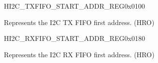     \begin{register}{H}{I2C\_TXFIFO\_START\_ADDR\_REG}{0x0100}\label{regdesc:I2CTXFIFOSTARTADDRREG}
    \regnewline%
    \begin{regdesc}\begin{reglist}
    \label{fielddesc:I2CTXFIFOSTARTADDR}\item [I2C\_TXFIFO\_START\_ADDR] Represents the I2C TX FIFO first address. (HRO)
    \end{reglist}\end{regdesc}
    \end{register}


    \begin{register}{H}{I2C\_RXFIFO\_START\_ADDR\_REG}{0x0180}\label{regdesc:I2CRXFIFOSTARTADDRREG}
    \regnewline%
    \begin{regdesc}\begin{reglist}
    \label{fielddesc:I2CRXFIFOSTARTADDR}\item [I2C\_RXFIFO\_START\_ADDR] Represents the I2C RX FIFO first address. (HRO)
    \end{reglist}\end{regdesc}
    \end{register}


